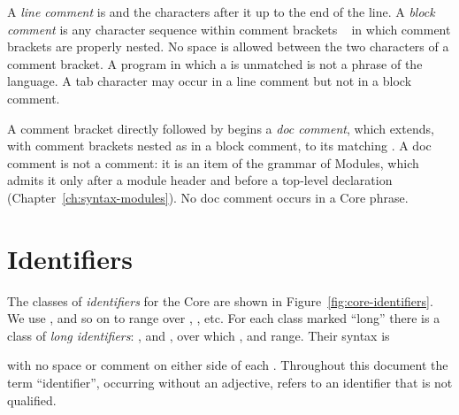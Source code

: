 A \emph{line comment} is \kw{-{}-} and the characters after it up to the end of
the line. A \emph{block comment} is any character sequence within comment
brackets \kw{\kwlb-}~\kw{-\kwrb} in which comment brackets are properly
nested. No space is allowed between the two characters of a comment bracket.
A program in which a \kw{\kwlb-} is unmatched is not a phrase of the language.
A tab character may occur in a line comment but not in a block comment.

A comment bracket \kw{\kwlb-} directly followed by \kw{|} begins a \emph{doc
comment}, which extends, with comment brackets nested as in a block comment,
to its matching \kw{-\kwrb}. A doc comment is not a comment: it is an item of
the grammar of Modules, which admits it only after a module header and before
a top-level declaration (Chapter~\ref{ch:syntax-modules}). No doc comment
occurs in a Core phrase.

\section{Identifiers}

The classes of \emph{identifiers} for the Core are shown in
Figure~\ref{fig:core-identifiers}. We use \var, \tyvar{} and so on to range
over , , etc. For each class marked ``long'' there is a
class of \emph{long identifiers}: ,  and
, over which \longvar, \longcon{} and \longtycon{} range. Their
syntax is
\begin{center}
\begin{grammar}
\end{grammar}
\end{center}
with no space or comment on either side of each . Throughout this
document the term ``identifier'', occurring without an adjective, refers to an
identifier that is not qualified.

